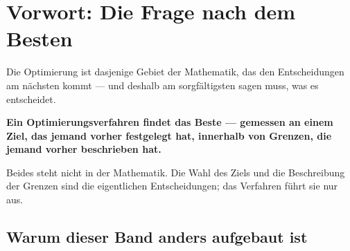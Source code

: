 \chapter*{Vorwort: Die Frage nach dem Besten}

Die Optimierung ist dasjenige Gebiet der Mathematik, das den Entscheidungen am nächsten kommt --- und deshalb am sorgfältigsten sagen muss, was es  entscheidet.

\begin{merksatz}
\begin{center}
\begin{minipage}{0.9\textwidth}
\textbf{Ein Optimierungsverfahren findet das Beste --- gemessen an einem Ziel, das jemand vorher festgelegt hat, innerhalb von Grenzen, die jemand vorher beschrieben hat.}
\end{minipage}
\end{center}

Beides steht nicht in der Mathematik. Die Wahl des Ziels und die Beschreibung der Grenzen sind die eigentlichen Entscheidungen; das Verfahren führt sie nur aus.

\begin{center}
\begin{minipage}{0.88\textwidth}
\end{minipage}
\end{center}
\end{merksatz}

\section*{Warum dieser Band anders aufgebaut ist}

